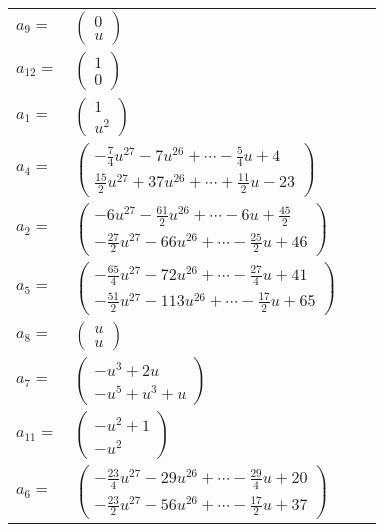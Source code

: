 \documentclass[1p]{elsarticle_modified}
\theoremstyle{definition}
\begin{document}
\begin{tabular}{m{7pt} m{180pt} m{7pt} m{180pt} }
\flushright $a_{9}=$&$\begin{pmatrix}0\\u\end{pmatrix}$ \\
\flushright $a_{12}=$&$\begin{pmatrix}1\\0\end{pmatrix}$ \\
\flushright $a_{1}=$&$\begin{pmatrix}1\\u^2\end{pmatrix}$ \\
\flushright $a_{4}=$&$\begin{pmatrix}-\frac{7}{4} u^{27}-7 u^{26}+\cdots-\frac{5}{4} u+4\\\frac{15}{2} u^{27}+37 u^{26}+\cdots+\frac{11}{2} u-23\end{pmatrix}$ \\
\flushright $a_{2}=$&$\begin{pmatrix}-6 u^{27}-\frac{61}{2} u^{26}+\cdots-6 u+\frac{45}{2}\\-\frac{27}{2} u^{27}-66 u^{26}+\cdots-\frac{25}{2} u+46\end{pmatrix}$ \\
\flushright $a_{5}=$&$\begin{pmatrix}-\frac{65}{4} u^{27}-72 u^{26}+\cdots-\frac{27}{4} u+41\\-\frac{51}{2} u^{27}-113 u^{26}+\cdots-\frac{17}{2} u+65\end{pmatrix}$ \\
\flushright $a_{8}=$&$\begin{pmatrix}u\\u\end{pmatrix}$ \\
\flushright $a_{7}=$&$\begin{pmatrix}- u^3+2 u\\- u^5+u^3+u\end{pmatrix}$ \\
\flushright $a_{11}=$&$\begin{pmatrix}- u^2+1\\- u^2\end{pmatrix}$ \\
\flushright $a_{6}=$&$\begin{pmatrix}-\frac{23}{4} u^{27}-29 u^{26}+\cdots-\frac{29}{4} u+20\\-\frac{23}{2} u^{27}-56 u^{26}+\cdots-\frac{17}{2} u+37\end{pmatrix}$ \\

\end{tabular}
\end{document}
